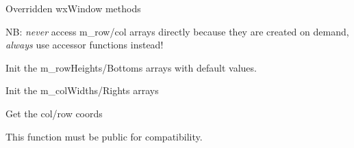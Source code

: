 \label{wxgridgetdividerpen}



\label{wxgridonactivate}


\label{wxgridfit}


Overridden wxWindow methods

\label{wxgriddogetbestsize}


\label{wxgridinitrowheights}


NB: {\it never} access m\_row/col arrays directly because they are created
on demand, {\it always} use accessor functions instead!

Init the m\_rowHeights/Bottoms arrays with default values.

\label{wxgridinitcolwidths}


Init the m\_colWidths/Rights arrays


\label{wxgridgetcolwidth}


Get the col/row coords


\label{wxgridgetcolleft}



\label{wxgridgetcolright}



\label{wxgridgetrowheight}


This function must be public for compatibility.

\label{wxgridgetrowtop}



